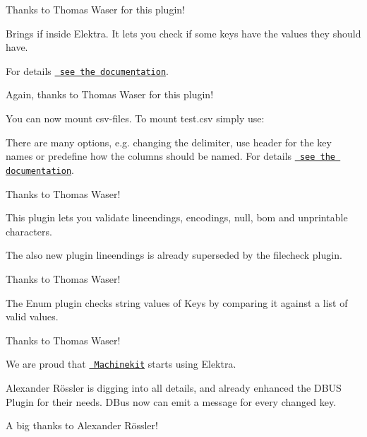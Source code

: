 Thanks to Thomas Waser for this plugin!

Brings {\ttfamily if} inside Elektra. It lets you check if some keys have the values they should have.


\begin{DoxyCode}{0}
\end{DoxyCode}


For details \href{https://master.libelektra.org/src/plugins/conditionals/}{\texttt{ see the documentation}}.

Again, thanks to Thomas Waser for this plugin!

You can now mount csv-\/files. To mount {\ttfamily test.\+csv} simply use\+:


\begin{DoxyCode}{0}
\end{DoxyCode}


There are many options, e.\+g. changing the delimiter, use header for the key names or predefine how the columns should be named. For details \href{https://master.libelektra.org/src/plugins/csvstorage/}{\texttt{ see the documentation}}.

Thanks to Thomas Waser!

This plugin lets you validate lineendings, encodings, null, bom and unprintable characters.

The also new plugin lineendings is already superseded by the filecheck plugin.

Thanks to Thomas Waser!

The Enum plugin checks string values of Keys by comparing it against a list of valid values.

Thanks to Thomas Waser!

We are proud that \href{http://www.machinekit.io/}{\texttt{ Machinekit}} starts using Elektra.

Alexander Rössler is digging into all details, and already enhanced the D\+B\+US Plugin for their needs. D\+Bus now can emit a message for every changed key.

A big thanks to Alexander Rössler!


